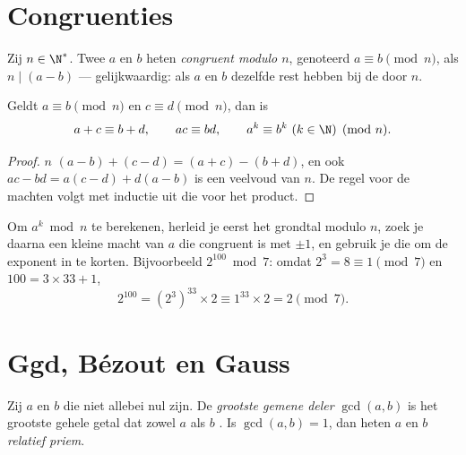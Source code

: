 \section{Congruenties}

\begin{definition}[Congruentie]\label{def:g12:arith:congruence}
Zij $n \in \N^*$. Twee  $a$ en $b$ heten \emph{congruent modulo
$n$}, genoteerd $a \equiv b \pmod n$, als $n \mid (a - b)$
--- gelijkwaardig: als $a$ en $b$ dezelfde rest hebben bij de  door $n$.
\end{definition}

\begin{proposition}\label{prop:g12:arith:congops}
Geldt $a \equiv b \pmod n$ en $c \equiv d \pmod n$, dan is
\[
a + c \equiv b + d, \qquad
ac \equiv bd, \qquad
a^k \equiv b^k \ (k \in \N) \pmod n .
\]
\end{proposition}

\begin{proof}
$n$  $(a-b) + (c-d) = (a+c) - (b+d)$, en ook
$ac - bd = a(c - d) + d(a - b)$ is een veelvoud van $n$. De regel voor de
machten volgt met inductie uit die voor het product.
\end{proof}

\begin{method}\label{met:g12:arith:powers}
Om $a^k \bmod n$ te berekenen, herleid je eerst het grondtal modulo $n$, zoek
je daarna een kleine macht van $a$ die congruent is met $\pm1$, en gebruik je
die om de exponent in te korten. Bijvoorbeeld $2^{100} \bmod 7$: omdat
$2^3 = 8 \equiv 1 \pmod 7$ en $100 = 3\times33 + 1$,
\[
2^{100} = \left(2^{3}\right)^{33} \times 2 \equiv 1^{33}\times 2 = 2 \pmod 7 .
\]
\end{method}

\section{Ggd, Bézout en Gauss}

\begin{definition}[Ggd]\label{def:g12:arith:gcd}
Zij $a$ en $b$  die niet allebei nul zijn. De \emph{grootste
gemene deler} $\gcd(a, b)$ is het grootste gehele
getal dat zowel $a$ als $b$ . Is $\gcd(a,b) = 1$, dan heten $a$ en $b$
\emph{relatief priem}.
\end{definition}

